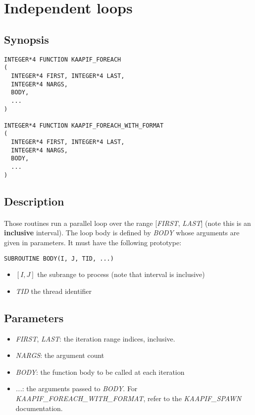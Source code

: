 \documentclass[a4paper, 11pt]{article}
\begin{document}
\newpage
\section{Independent loops}

\subsection{Synopsis}
\begin{small}
\lstset{language=C}
\begin{lstlisting}[frame=tb]
INTEGER*4 FUNCTION KAAPIF_FOREACH
(
  INTEGER*4 FIRST, INTEGER*4 LAST,
  INTEGER*4 NARGS,
  BODY,
  ...
)

INTEGER*4 FUNCTION KAAPIF_FOREACH_WITH_FORMAT
(
  INTEGER*4 FIRST, INTEGER*4 LAST,
  INTEGER*4 NARGS,
  BODY,
  ...
)
\end{lstlisting}
\end{small}

\subsection{Description}
\paragraph{}
Those routines run a parallel loop over the range [\textit{FIRST}, \textit{LAST}]
(note this is an \textbf{inclusive} interval).
The loop body is defined by \textit{BODY} whose arguments are given
in parameters. It must have the following prototype:\\
\begin{small}
\lstset{language=C}
\begin{lstlisting}[frame=tb]
SUBROUTINE BODY(I, J, TID, ...)
\end{lstlisting}
\end{small}
\begin{itemize}
\item $[I, J]$ the subrange to process (note that interval is inclusive)
\item \textit{TID} the thread identifier
\end{itemize}

\subsection{Parameters}
\begin{itemize}
\item \textit{FIRST}, \textit{LAST}: the iteration range indices, inclusive.
\item \textit{NARGS}: the argument count
\item \textit{BODY}: the function body to be called at each iteration
\item \textit{...}: the arguments passed to \textit{BODY}. For
\textit{KAAPIF\_FOREACH\_WITH\_FORMAT}, refer to the \textit{KAAPIF\_SPAWN}
documentation.
\end{itemize}
\end{document}
